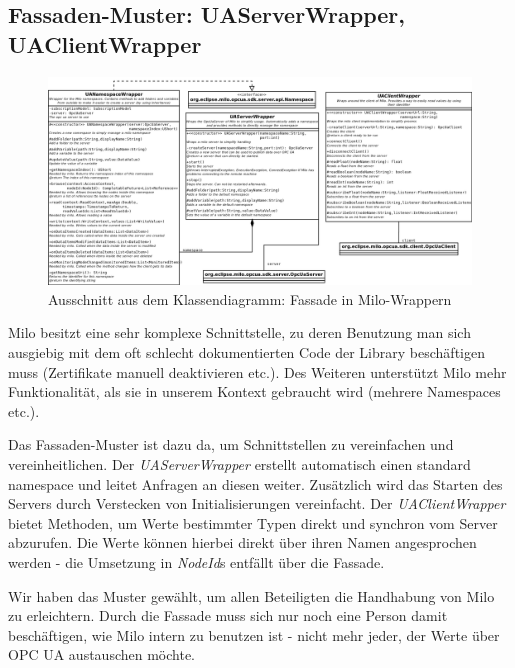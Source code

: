 \documentclass[parskip=full]{scrartcl}
\begin{document}
\subsection{Fassaden-Muster: UAServerWrapper, UAClientWrapper}
\begin{figure}[H]
  \centering
  \includegraphics[scale=0.3]{design/pattern-screenshots/fascade-UAWrapper.png}
  \caption{Ausschnitt aus dem Klassendiagramm: Fassade in Milo-Wrappern}
\end{figure}
Milo besitzt eine sehr komplexe Schnittstelle, zu deren Benutzung man sich ausgiebig mit dem oft schlecht dokumentierten Code
der Library beschäftigen muss (Zertifikate manuell deaktivieren etc.). Des Weiteren unterstützt Milo mehr Funktionalität,
als sie in unserem Kontext gebraucht wird (mehrere Namespaces etc.).

Das Fassaden-Muster ist dazu da, um Schnittstellen zu vereinfachen und vereinheitlichen.
Der \emph{UAServerWrapper} erstellt automatisch einen standard namespace und leitet Anfragen an
diesen weiter. Zusätzlich wird das Starten des Servers durch Verstecken von Initialisierungen vereinfacht. Der \emph{UAClientWrapper}
bietet Methoden, um Werte bestimmter Typen direkt und synchron vom Server abzurufen. Die Werte können hierbei direkt über ihren
Namen angesprochen werden - die Umsetzung in \emph{NodeId}s entfällt über die Fassade.

Wir haben das Muster gewählt, um allen
Beteiligten die Handhabung von Milo zu erleichtern. Durch die Fassade muss sich nur noch eine Person damit beschäftigen, wie
Milo intern zu benutzen ist - nicht mehr jeder, der Werte über OPC UA austauschen möchte.

\pagebreak
\end{document}

